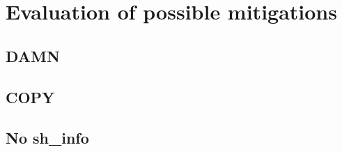 \section{Evaluation of possible mitigations}
\subsection{DAMN}
\subsection{COPY}
\subsection{No sh\_info}